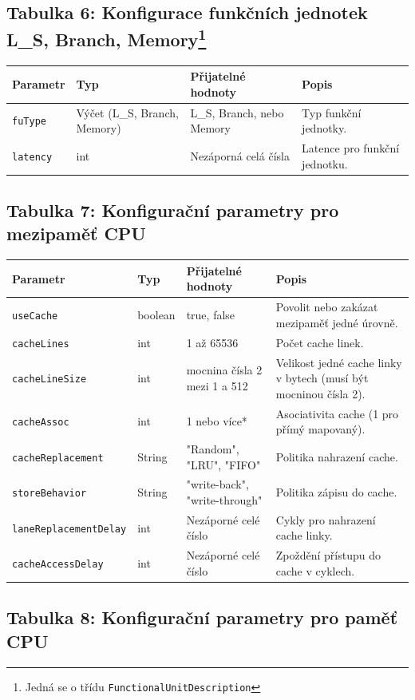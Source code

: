 \subsection*{Tabulka 6: Konfigurace funkčních jednotek L\_S, Branch, Memory\footnote{Jedná se o třídu \texttt{Functional\-Unit\-Description}}}

\begin{tabular}{|l|p{3.5cm}|p{4cm}|p{5cm}|}
\hline
Parametr & Typ & Přijatelné hodnoty & Popis \\
\hline
\texttt{fuType} & Výčet (L\_S, Branch, Memory) & L\_S, Branch, nebo Memory & Typ funkční jednotky. \\
\texttt{latency} & int & Nezáporná celá čísla & Latence pro funkční jednotku. \\
\hline
\end{tabular}

\subsection*{Tabulka 7: Konfigurační parametry pro mezipaměť CPU}

\begin{tabular}{|l|l|p{4.2cm}|p{4.5cm}|}
\hline
Parametr & Typ & Přijatelné hodnoty & Popis \\
\hline
\texttt{useCache} & boolean & true, false & Povolit nebo zakázat mezipaměť jedné úrovně. \\
\texttt{cacheLines} & int & 1 až 65536 & Počet cache linek. \\
\texttt{cacheLineSize} & int & mocnina čísla 2 mezi 1 a 512 & Velikost jedné cache linky v bytech (musí být mocninou čísla 2). \\
\texttt{cacheAssoc} & int & 1 nebo více* & Asociativita cache (1 pro přímý mapovaný). \\
\texttt{cacheReplacement} & String & "Random", "LRU", "FIFO" & Politika nahrazení cache. \\
\texttt{storeBehavior} & String & "write-back", "write-through" & Politika zápisu do cache. \\
\texttt{laneReplacementDelay} & int & Nezáporné celé číslo & Cykly pro nahrazení cache linky. \\
\texttt{cacheAccessDelay} & int & Nezáporné celé číslo & Zpoždění přístupu do cache v cyklech. \\
\hline
\end{tabular}

\subsection*{Tabulka 8: Konfigurační parametry pro paměť CPU}

